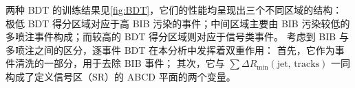 两种 BDT 的训练结果见\autoref{fig:BDT}，它们的性能均呈现出三个不同区域的结构：
极低 BDT 得分区域对应于高 BIB 污染的事件；中间区域主要由 BIB 污染较低的多喷注事件构成；而较高的 BDT 得分区域则对应于信号类事件。
考虑到 BIB 与多喷注之间的区分，逐事件 BDT 在本分析中发挥着双重作用：
首先，它作为事件清洗的一部分，用于去除 BIB 事件；
其次，它与 $\sum \Delta R_\mathrm{min}(\text{jet, tracks})$ 一同构成了定义信号区（SR）的 ABCD 平面的两个变量。







